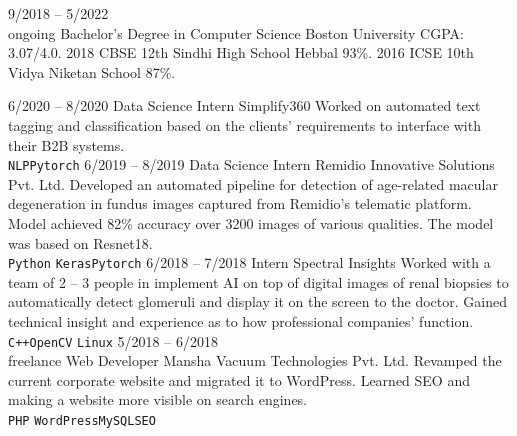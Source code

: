 \documentclass[9pt]{developercv} %
\begin{document}
\vspace{0.5cm}



\begin{entrylist}
  \entry
  {9/2018 -- 5/2022\\\footnotesize{ongoing}}
  {Bachelor's Degree in Computer Science}
  {Boston University}
  {CGPA: 3.07/4.0.}
  \entry
  {2018}
  {CBSE 12th}
  {Sindhi High School Hebbal}
  {93\%.}
  \entry
  {2016}
  {ICSE 10th}
  {Vidya Niketan School}
  {87\%.}
\end{entrylist}



\begin{entrylist}
  \entry
  {6/2020 -- 8/2020}
  {Data Science Intern}
  {Simplify360}
  {Worked on automated text tagging and classification based on the clients' requirements to interface with their B2B systems. \\
    \texttt{NLP}\slashsep\texttt{Pytorch}}
  \entry
  {6/2019 -- 8/2019}
  {Data Science Intern}
  {Remidio Innovative Solutions Pvt. Ltd.}
  {Developed an automated pipeline for detection of age-related macular degeneration in fundus images captured from Remidio’s telematic platform. Model achieved 82\% accuracy over 3200 images of various qualities. The model was based on Resnet18.\\ \texttt{Python}
    \slashsep\texttt{Keras}\slashsep\texttt{Pytorch}}
  \entry
  {6/2018 -- 7/2018}
  {Intern}
  {Spectral Insights}
  {Worked with a team of 2 – 3 people in implement AI on top of digital images of renal biopsies to automatically detect glomeruli and display it on the screen to the doctor. Gained technical insight and experience as to how professional companies’ function. \\ \texttt{C++}\slashsep\texttt{OpenCV}
    \slashsep\texttt{Linux}}
  \entry
  {5/2018 -- 6/2018\\\footnotesize{freelance}}
  {Web Developer}
  {Mansha Vacuum Technologies Pvt. Ltd.}
  {Revamped the current corporate website and migrated it to WordPress. Learned SEO and making a website more visible on search engines. \\ \texttt{PHP}
    \slashsep\texttt{WordPress}\slashsep\texttt{MySQL}\slashsep\texttt{SEO}}
\end{entrylist}
\end{document}
